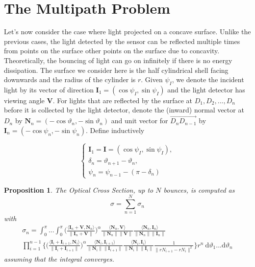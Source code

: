 \documentclass[11pt,reqno]{amsart}
\newtheorem{proposition}{Proposition}
\newcommand{\ip}[2]{\langle {#1}, {#2} \rangle}
\theoremstyle{definition}
\begin{document}
\section{The Multipath Problem}
Let's now consider the case where light projected on a concave surface. Unlike
the previous cases, the light detected by the sensor can be reflected multiple
times from points on the surface other points on the surface due to concavity.
Theoretically, the bouncing of light can go on infinitely if there is no energy
dissipation. The surface we consider here is the half cylindrical shell facing
downwards and the radius of the cylinder is $r$. Given $\psi_I$, we denote the
incident light by its vector of direction
$\mathbf{I}_1=(\cos\psi_I,\sin\psi_I)$ and the light detector has viewing angle
$\mathbf{V}$. For lights that are reflected by the surface at $D_1,D_2,...,D_n$
before it is collected by the light detector, denote the (inward) normal vector
at $D_n$ by $\mathbf{N}_n=(-\cos\vartheta_n,-\sin\vartheta_n)$ and unit vector
for $\overrightarrow{D_{n}D_{n-1}}$ by
$\mathbf{I}_n=(-\cos\psi_n,-\sin\psi_n)$.  Define inductively

\begin{equation}\label{equ:induct}
\begin{cases}\mathbf{I}_1=\mathbf{I}=(\cos\psi_{I},\sin\psi_{I}),\\
\delta_n=\vartheta_{n+1}-\vartheta_n,\\
\psi_n=\psi_{n-1}-(\pi-\delta_n)\end{cases}
\tag{$\ast$}
\end{equation} 

\begin{proposition}
The Optical Cross Section, up to $N$ bounces, is computed as
\[
\sigma=\sum_{n=1}^{N}\sigma_n
\]
with
\begin{multline*}
\sigma_n =
\int_{0}^{\pi}...\int_{0}^{\pi}
\Bigg(\frac{\ip{\mathbf{I}_n+\mathbf{V}}{\mathbf{N}_n}}{\|\mathbf{I}_n+\mathbf{V}\|}\Bigg)^\alpha\frac{\ip{\mathbf{N}_n}{\mathbf{V}}}{\|\mathbf{N}_n\| \|\mathbf{V}\|}\frac{\ip{\mathbf{N}_n}{\mathbf{I}_n}}{\|\mathbf{N}_n\| \|\mathbf{I}_n\|} \\ 
\prod_{i=1}^{n-1}\bigg\{ \Bigg(\frac{\ip{\mathbf{I}_i+\mathbf{I}_{i+1}}{\mathbf{N}_i}}{\|\mathbf{I}_i+\mathbf{I}_{i+1}\|}\Bigg)^\alpha \frac{\ip{\mathbf{N}_i}{\mathbf{I}_{i+1}}}{\|\mathbf{N}_i\| \|\mathbf{I}_{i+1}\|}\frac{\ip{\mathbf{N}_i}{\mathbf{I}_i}}{\|\mathbf{N}_i\| \|\mathbf{I}_i\|}\frac{1}{\|rN_{i+1}-rN_i\|^2}\bigg\}r^n\: \mathrm{d}\vartheta_1...\mathrm{d}\vartheta_n\end{multline*}
assuming that the integral converges.
\end{proposition}
\end{document}
